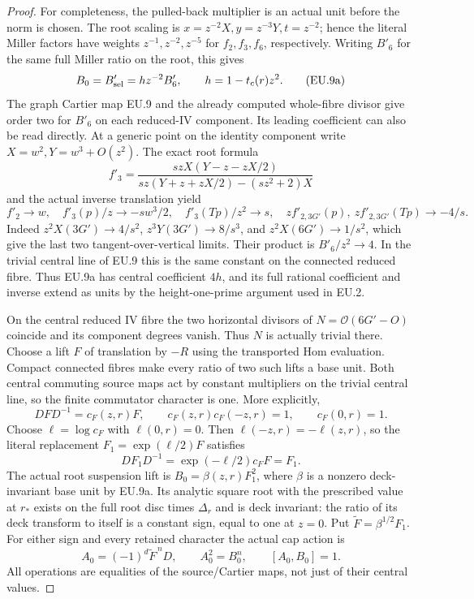 \begin{proof}
For completeness, the pulled-back multiplier is an actual unit before
the norm is chosen. The root scaling is
\(x=z^{-2}X,y=z^{-3}Y,t=z^{-2}\); hence the literal Miller factors
have weights \(z^{-1},z^{-2},z^{-5}\) for \(f_2,f_3,f_6\), respectively.
Writing \(B'_6\) for the same full Miller ratio on the root, this gives
\[
 B_0=B'_{\rm sel}=h z^{-2}B'_6,\qquad
 h=1-t_c(r)z^2.
 \tag{EU.9a}
\]
The graph Cartier map EU.9 and the already computed whole-fibre divisor
give order two for \(B'_6\) on each reduced-IV component. Its leading
coefficient can also be read directly. At a generic point on the
identity component write \(X=w^2,Y=w^3+O(z^2)\). The exact root formula
\[
 f'_3=\frac{s zX(Y-z-zX/2)}
              {s z(Y+z+zX/2)-(s z^2+2)X}
\]
and the actual inverse translation yield
\[
 f'_2\to w,\quad f'_3(p)/z\to-s w^3/2,\quad
 f'_3(Tp)/z^2\to s,\quad
 z f'_{2,3G'}(p),\ z f'_{2,3G'}(Tp)\to-4/s.
\]
Indeed \(z^2X(3G')\to4/s^2\),
\(z^3Y(3G')\to8/s^3\), and \(z^2X(6G')\to1/s^2\),
which give the last two tangent-over-vertical limits. Their product
is \(B'_6/z^2\to4\). In the trivial central line of EU.9 this is
the same constant on the connected reduced fibre. Thus EU.9a has
central coefficient \(4h\), and its full rational coefficient and
inverse extend as units by the height-one-prime argument used in EU.2.

On the central reduced IV fibre the two horizontal divisors of
\(N=\mathcal O(6G'-O)\) coincide and its component degrees vanish.
Thus \(N\) is actually trivial there. Choose a lift \(F\) of
translation by \(-R\) using the transported Hom evaluation. Compact
connected fibres make every ratio of two such lifts a base unit.
Both central commuting source maps act by constant multipliers on
the trivial central line, so the finite commutator character is one.
More explicitly,
\[
 DFD^{-1}=c_F(z,r)F,\qquad
 c_F(z,r)c_F(-z,r)=1,\qquad c_F(0,r)=1.
\]
Choose \(\ell=\log c_F\) with \(\ell(0,r)=0\). Then
\(\ell(-z,r)=-\ell(z,r)\), so the literal replacement
\(F_1=\exp(\ell/2)F\) satisfies
\[
 DF_1D^{-1}=\exp(-\ell/2)c_FF=F_1.
\]
The actual root suspension lift is
\(B_0=\beta(z,r)F_1^2\), where \(\beta\) is a nonzero
deck-invariant base unit by EU.9a. Its analytic square root with
the prescribed value at \(r_*\) exists on the full root disc times
\(\Delta_r\) and is deck invariant: the ratio of its deck transform
to itself is a constant sign, equal to one at \(z=0\).
Put \(\widetilde F=\beta^{1/2}F_1\). For either sign and every retained
character the actual cap action is
\[
 A_0=(-1)^d\widetilde F^{\,n}D,\qquad
 A_0^2=B_0^n,\qquad [A_0,B_0]=1.
 \tag{EU.10}
\]
All operations are equalities of the source/Cartier maps, not just
of their central values.


\end{proof}

